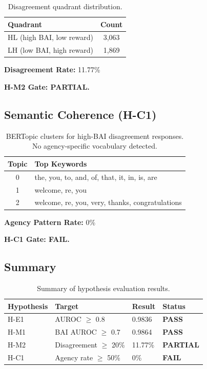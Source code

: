\begin{table}[h]
\centering
\begin{tabular}{lc}
\toprule
Quadrant & Count \\
\midrule
HL (high BAI, low reward) & 3,063 \\
LH (low BAI, high reward) & 1,869 \\
\bottomrule
\end{tabular}
\caption{Disagreement quadrant distribution.}
\label{tab:disagreement}
\end{table}

\textbf{Disagreement Rate:} 11.77\%

\textbf{H-M2 Gate: PARTIAL.}

\subsection{Semantic Coherence (H-C1)}

\begin{table}[h]
\centering
\begin{tabular}{cl}
\toprule
Topic & Top Keywords \\
\midrule
0 & the, you, to, and, of, that, it, in, is, are \\
1 & welcome, re, you \\
2 & welcome, re, you, very, thanks, congratulations \\
\bottomrule
\end{tabular}
\caption{BERTopic clusters for high-BAI disagreement responses. No agency-specific vocabulary detected.}
\label{tab:semantic}
\end{table}

\textbf{Agency Pattern Rate:} 0\%

\textbf{H-C1 Gate: FAIL.}

\subsection{Summary}

\begin{table}[h]
\centering
\begin{tabular}{llll}
\toprule
Hypothesis & Target & Result & Status \\
\midrule
H-E1 & AUROC $\geq$ 0.8 & 0.9836 & \textbf{PASS} \\
H-M1 & BAI AUROC $\geq$ 0.7 & 0.9864 & \textbf{PASS} \\
H-M2 & Disagreement $\geq$ 20\% & 11.77\% & \textbf{PARTIAL} \\
H-C1 & Agency rate $\geq$ 50\% & 0\% & \textbf{FAIL} \\
\bottomrule
\end{tabular}
\caption{Summary of hypothesis evaluation results.}
\label{tab:summary}
\end{table}
